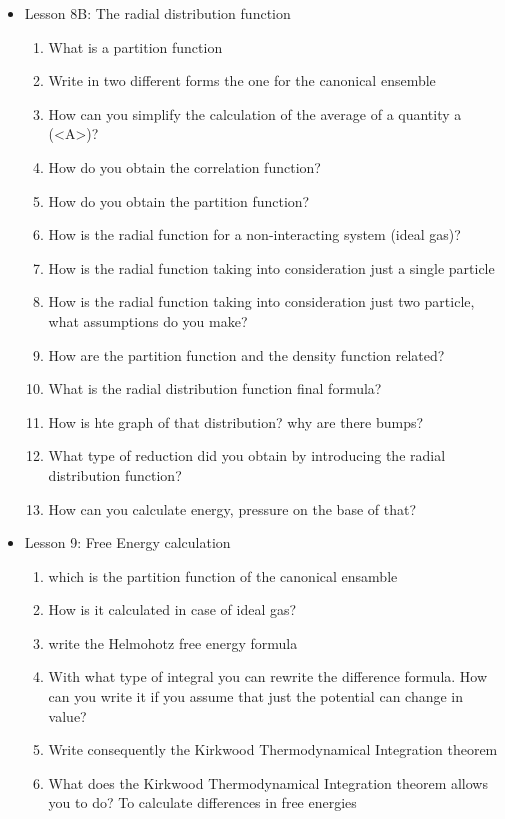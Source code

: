 {\begin{itemize}
\begin{enumerate}
    \end{enumerate}
    \item Lesson 8B: The radial distribution function
    \begin{enumerate}
        \item What is a partition function
        \item Write in two different forms the one for the canonical ensemble
        \item How can you simplify the calculation of the average of a quantity a (<A>)?
        \item How do you obtain the correlation function?
        \item How do you obtain the partition function?
        \item How is the radial function for a non-interacting system (ideal gas)?
        \item How is the radial function taking into consideration just a single particle
        \item How is the radial function taking into consideration just two particle, what assumptions do you make?
        \item How are the partition function and the density function related?
        \item What is the radial distribution function final formula?
        \item How is hte graph of that distribution? why are there bumps?
        \item What type of reduction did you obtain by introducing the radial distribution function?	
        \item How can you calculate energy, pressure on the base of that?
    \end{enumerate}
    \item Lesson 9: Free Energy calculation
    \begin{enumerate}
        \item which is the partition function of the canonical ensamble
        \item How is it calculated in case of ideal gas?
        \item write the Helmohotz free energy formula
        \item With what type of integral you can rewrite the difference formula. How can you write it if you assume that just the potential can change in value?
        \item Write consequently the Kirkwood Thermodynamical Integration theorem
        \item What does the Kirkwood Thermodynamical Integration theorem allows you to do? To calculate differences in free energies

\end{enumerate}
\end{itemize}}
